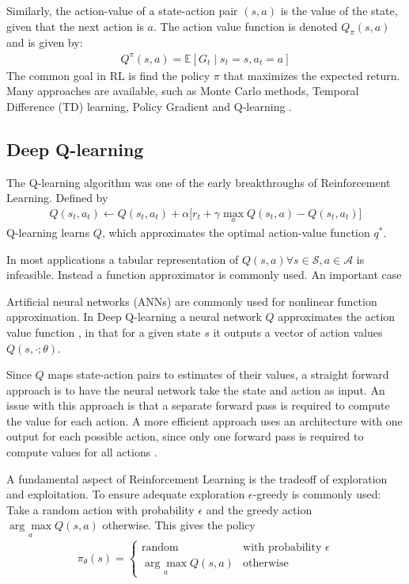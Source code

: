 \documentclass{article}
\begin{document}
Similarly, the action-value of a state-action pair $(s,a)$ is the value of the state, given that the next action is $a$. The action value function is denoted $Q_\pi(s,a)$ and is given by:
\begin{align*}
  Q^\pi(s,a) = \mathbb{E}[G_t \mid s_t = s, a_t = a]
\end{align*}
The common goal in RL is find the policy $\pi$ that maximizes the expected return. Many approaches are available, such as Monte Carlo methods, Temporal Difference (TD) learning, Policy Gradient and Q-learning \cite{Sutton1998}.

\subsection{Deep Q-learning}
The Q-learning algorithm \cite{watkins} was one of the early breakthroughs of Reinforcement Learning. Defined by
\begin{align}
  \label{eq:Qlearning}
  Q(s_t, a_t) \gets Q(s_t, a_t) + \alpha \Big[ r_t + \gamma \max_a Q(s_t, a) - Q(s_t, a_t)\Big]
\end{align}
Q-learning learns $Q$, which approximates the optimal action-value function $q^*$.

In most applications a tabular representation of $Q(s,a) \forall s \in \mathcal{S}, a \in \mathcal{A}$ is infeasible. Instead a function approximator is commonly used. An important case

Artificial neural networks (ANNs) are commonly used for nonlinear function approximation. In Deep Q-learning a neural network $Q$ approximates the action value function \cite{Sutton1998}, in that for a given state $s$ it outputs a vector of action values $Q(s,\cdot; \theta)$.

Since $Q$ maps state-action pairs to estimates of their values, a straight forward approach is to have the neural network take the state and action as input. An issue with this approach is that a separate forward pass is required to compute the value for each action. A more efficient approach uses an architecture with one output for each possible action, since only one forward pass is required to compute values for all actions \cite{mnih2015humanlevel}.

A fundamental aspect of Reinforcement Learning is the tradeoff of exploration and exploitation. To ensure adequate exploration $\epsilon$-greedy is commonly used: Take a random action with probability $\epsilon$
and the greedy action $\underset{a}{\arg \max} Q(s,a)$ otherwise. This gives the policy
\begin{align*}
  \pi_\theta (s) =
  \begin{cases}
    \text{random}                   & \text{with probability } \epsilon \\
    \underset{a}{\arg \max} Q(s, a) & \text{otherwise}
  \end{cases}
\end{align*}
\end{document}

